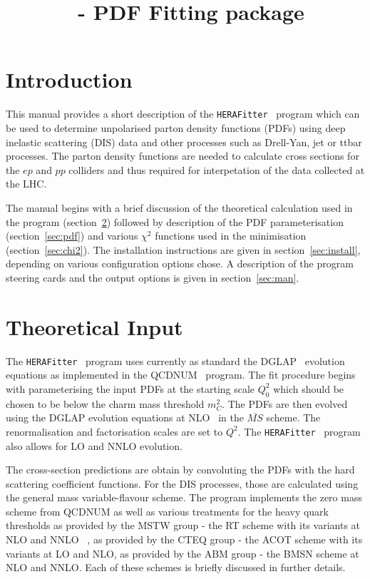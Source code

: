 \documentclass[11pt,a4paper]{article}
\title{\fitter\ - PDF Fitting package}
\newcommand\fitter{ \mbox{\tt HERAFitter} }
\begin{document}
\maketitle
\begin{abstract}
\end{abstract}
\tableofcontents
\newpage
\section{Introduction}
This manual provides a short description of the \fitter\ program 
which can be used to determine unpolarised parton density functions 
(PDFs) using deep inelastic scattering (DIS) data and other processes such as 
Drell-Yan, jet or ttbar processes.
The parton density functions are needed to calculate cross sections
for the $ep$ and $pp$ colliders and thus required for interpetation
of the data collected at the LHC.

The manual begins with a brief discussion of the theoretical calculation
used in the program (section~\ref{sec:theory}) followed by description of the
PDF parameterisation (section~\ref{sec:pdf}) and various $\chi^2$ functions used in the
minimisation (section~\ref{sec:chi2}). The installation instructions are given in
section~\ref{sec:install}, depending on various configuration options chose. A description of the program steering cards and
the output options is given in section~\ref{sec:man}.

\section{Theoretical Input}
\label{sec:theory}
The \fitter\ program uses currently as standard the DGLAP~\cite{Gribov:1972ri,Gribov:1972rt,Lipatov:1974qm,Dokshitzer:1977sg,Altarelli:1977zs}
 evolution equations as implemented in the QCDNUM~\cite{qcdnum} program. The fit 
procedure begins with parameterising the input PDFs at the starting 
scale $Q^2_0$ which should be chosen to be below the charm mass threshold
$m_C^2$.
The PDFs are then evolved using the DGLAP evolution equations  
at NLO~\cite{Curci:1980uw,Furmanski:1980cm} in the $\overline{MS}$ scheme.
The renormalisation and factorisation scales are set to $Q^2$. The \fitter\ program
also allows for LO and NNLO evolution. 

The cross-section predictions are obtain by convoluting the PDFs with the 
hard scattering coefficient functions. For the DIS processes, those are calculated 
using the general mass variable-flavour scheme. 
The program implements the  zero mass scheme from QCDNUM as well as
various treatments for the heavy quark thresholds as provided by the MSTW group
- the RT scheme with its variants at NLO and NNLO ~\cite{Thorne:1997ga,Thorne:2006qt}, as provided by the CTEQ group - the ACOT scheme with its variants at LO and NLO, as provided by the ABM group - the BMSN scheme at NLO and NNLO.
Each of these schemes is briefly discussed in further details.
\end{document}
